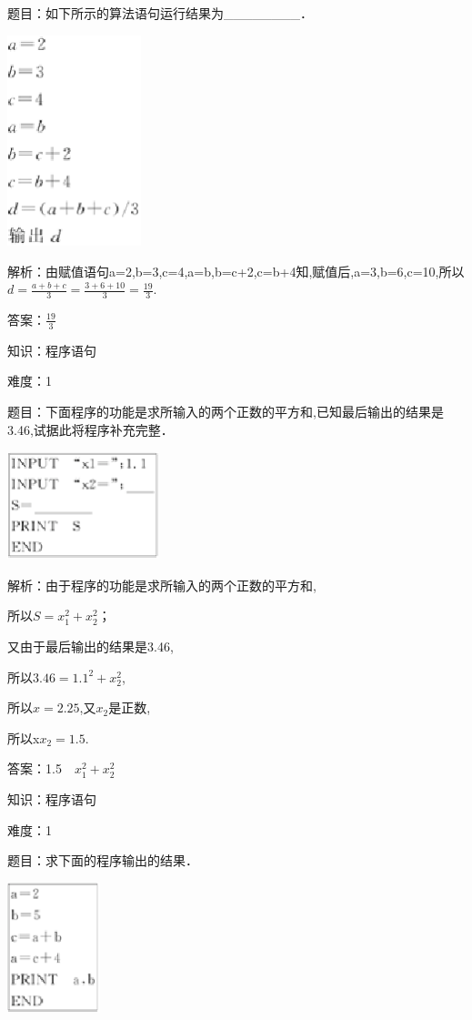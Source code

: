 \documentclass{article} %
\begin{document}
题目：如下所示的算法语句运行结果为\_\_\_\_\_\_\_\_．

\includegraphics*[width=1.54in, height=2.41in, keepaspectratio=false]{image33}

解析：由赋值语句a=2,b=3,c=4,a=b,b=c+2,c=b+4知,赋值后,a=3,b=6,c=10,所以$d=\frac{a+b+c}{3}=\frac{3+6+10}{3}=\frac{19}{3}$.

答案：$\frac{19}{3}$

知识：程序语句

难度：1

题目：下面程序的功能是求所输入的两个正数的平方和,已知最后输出的结果是3.46,试据此将程序补充完整．

\includegraphics*[width=1.74in, height=1.24in, keepaspectratio=false]{image34}

解析：由于程序的功能是求所输入的两个正数的平方和,

所以$S=x_1^2+x_2^2$；

又由于最后输出的结果是3.46,

所以$3.46=1.1^2+x_2^2$,

所以$x=2.25$,又$x_{2}$是正数,

所以x$x_{2}=1.5$.

答案：1.5　$x_1^2+x_2^2$

知识：程序语句

难度：1

题目：求下面的程序输出的结果．

\includegraphics*[width=1.06in, height=1.49in, keepaspectratio=false]{image35}
\end{document}
